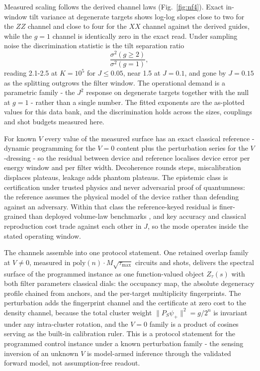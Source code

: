 Measured scaling follows the derived channel laws (Fig.~\ref{fig:nf4}). Exact in-window tilt variance at degenerate targets shows log-log slopes close to two for the $ZZ$ channel and close to four for the $XX$ channel against the derived guides, while the $g = 1$ channel is identically zero in the exact read. Under sampling noise the discrimination statistic is the tilt separation ratio
\[
\frac{\sigma^2(g \ge 2)}{\sigma^2(g = 1)},
\]
reading 2.1-2.5 at $K = 10^5$ for $J \le 0.05$, near 1.5 at $J = 0.1$, and gone by $J = 0.15$ as the splitting outgrows the filter window. The operational demand is a parametric family - the $J^2$ response on degenerate targets together with the null at $g = 1$ - rather than a single number. The fitted exponents are the as-plotted values for this data bank, and the discrimination holds across the sizes, couplings and shot budgets measured here.

For known $V$ every value of the measured surface has an exact classical reference - dynamic programming for the $V = 0$ content plus the perturbation series for the $V$-dressing - so the residual between device and reference localises device error per energy window and per filter width. Decoherence rounds steps, miscalibration displaces plateaus, leakage adds phantom plateaus. The epistemic class is certification under trusted physics and never adversarial proof of quantumness: the reference assumes the physical model of the device rather than defending against an adversary. Within that class the reference-keyed residual is finer-grained than deployed volume-law benchmarks \cite{boixo2018xeb}, and key accuracy and classical reproduction cost trade against each other in $J$, so the mode operates inside the stated operating window.

The channels assemble into one protocol statement. One retained overlap family at $V \neq 0$, measured in $\mathrm{poly}(n) \cdot M\sqrt{\tau_{\max}}$ circuits and shots, delivers the spectral surface of the programmed instance as one function-valued object $Z_\tau(s)$ with both filter parameters classical dials: the occupancy map, the absolute degeneracy profile chained from anchors, and the per-target multiplicity fingerprints. The perturbation adds the fingerprint channel and the certificate at zero cost to the density channel, because the total cluster weight $\|P_S \psi_+\|^2 = g/2^n$ is invariant under any intra-cluster rotation, and the $V = 0$ family is a product of cosines serving as the built-in calibration ruler. This is a protocol statement for the programmed control instance under a known perturbation family - the sensing inversion of an unknown $V$ is model-armed inference through the validated forward model, not assumption-free readout.

